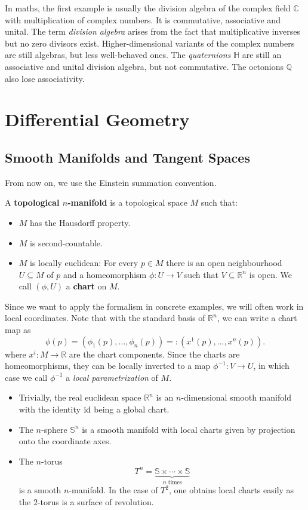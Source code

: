 \begin{eg}
    In maths, the first example is usually the division algebra of the complex field $\mathbb{C}$ with multiplication of complex numbers. It is commutative, associative and unital. The term \emph{division algebra} arises from the fact that multiplicative inverses but no zero divisors exist.
Higher-dimensional variants of the complex numbers are still algebras, but less well-behaved ones. The \emph{quaternions} $\mathbb{H}$ are still an associative and unital division algebra, but not commutative. The octonions $\mathbb{Q}$ also lose associativity.
\end{eg}
\section{Differential Geometry}
\subsection*{Smooth Manifolds and Tangent Spaces}
From now on, we use the Einstein summation convention.
\begin{definition}
    A \textbf{topological $n$-manifold} is a topological space $M$ such that:
    \begin{itemize}
        \item $M$ has the Hausdorff property.
        \item $M$ is second-countable.
        \item $M$ is locally euclidean: For every $p \in M$ there is an open neighbourhood $U \subseteq M$ of $p$ and a homeomorphism $\phi: U \to V$ such that $V \subseteq \mathbb{R}^n$ is open. We call $(\phi, U)$ a \textbf{chart} on $M$.
    \end{itemize}
\end{definition}
Since we want to apply the formalism in concrete examples, we will often work in local coordinates. Note that with the standard basis of $\mathbb{R}^n$, we can write a chart map as 
\[
\phi(p)=(\phi_1(p), \dots, \phi_n(p)) =: (x^1(p), \dots, x^n(p))
.\] where $x^i: M \to \mathbb{R}$ are the chart components. Since the charts are homeomorphisms, they can be locally inverted to a map $\phi^{-1}: V \to U$, in which case we call $\phi^{-1}$ a \emph{local parametrization} of $M$.
\begin{eg}
    \begin{itemize}
        \item Trivially, the real euclidean space $\mathbb{R}^n$ is an $n$-dimensional smooth manifold with the identity $\operatorname{id}$ being a global chart.
        \item The $n$-sphere $\mathbb{S}^n$ is a smooth manifold with local charts given by projection onto the coordinate axes.
    \item The $n$-torus \[T^n = \underbrace{\mathbb{S} \times \cdots \times \mathbb{S}}_{n\text{ times}}\] is a smooth $n$-manifold. In the case of $T^2$, one obtains local charts easily as the $2$-torus is a surface of revolution. 
    \end{itemize}
\end{eg}
